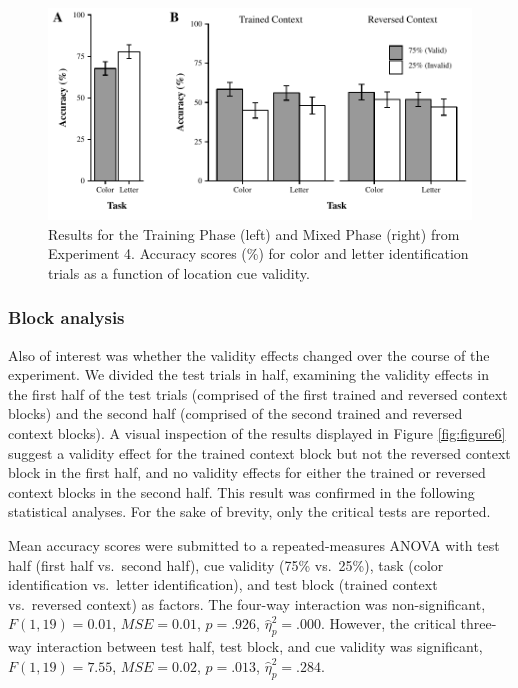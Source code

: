 \documentclass[english,,man,floatsintext]{apa6}
\begin{document}
\begin{figure}
\centering
\includegraphics{figures/IC-figure5.pdf}
\caption{\label{fig:figure5}Results for the Training Phase (left) and Mixed Phase
(right) from Experiment 4. Accuracy scores (\%) for color and letter
identification trials as a function of location cue validity.}
\end{figure}





\subsubsection{Block analysis}\label{block-analysis}

Also of interest was whether the validity effects changed over the
course of the experiment. We divided the test trials in half, examining
the validity effects in the first half of the test trials (comprised of
the first trained and reversed context blocks) and the second half
(comprised of the second trained and reversed context blocks). A visual
inspection of the results displayed in Figure \ref{fig:figure6} suggest
a validity effect for the trained context block but not the reversed
context block in the first half, and no validity effects for either the
trained or reversed context blocks in the second half. This result was
confirmed in the following statistical analyses. For the sake of
brevity, only the critical tests are reported.

Mean accuracy scores were submitted to a repeated-measures ANOVA with
test half (first half vs.~second half), cue validity (75\% vs.~25\%),
task (color identification vs.~letter identification), and test block
(trained context vs.~reversed context) as factors. The four-way
interaction was non-significant, \(F(1, 19) = 0.01\),
\(\mathit{MSE} = 0.01\), \(p = .926\), \(\hat{\eta}^2_p = .000\).
However, the critical three-way interaction between test half, test
block, and cue validity was significant, \(F(1, 19) = 7.55\),
\(\mathit{MSE} = 0.02\), \(p = .013\), \(\hat{\eta}^2_p = .284\).
\end{document}
